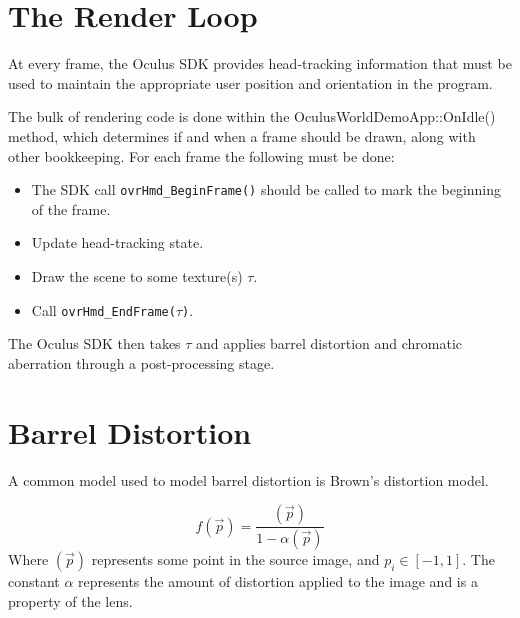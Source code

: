 \documentclass[12pt,a4paper,twoside,openright]{report}
\begin{document}
\section{The Render Loop}
At every frame, the Oculus SDK provides head-tracking information that must be used to maintain the appropriate user position and orientation in the program.

The bulk of rendering code is done within the OculusWorldDemoApp::OnIdle() method, which determines if and when a frame should be drawn, along with other bookkeeping.
For each frame the following must be done:

\begin{itemize}
  \item The SDK call \texttt{ovrHmd\_BeginFrame()} should be called to mark the beginning of the frame.
  \item Update head-tracking state.
  \item Draw the scene to some texture(s) $\tau$.
  \item Call \texttt{ovrHmd\_EndFrame($\tau$)}.
\end{itemize}

The Oculus SDK then takes $\tau$ and applies barrel distortion and chromatic aberration through a post-processing stage. 

\section{Barrel Distortion}\label{barSection}

A common model used to model barrel distortion is Brown's distortion model. 

\[
f(\vec p) = \frac{(\vec p)}{1-\alpha(\vec p)}
\]
Where $(\vec p)$ represents some point in the source image, and $p_i\in[-1,1]$. The constant $\alpha$ represents the amount of distortion applied to the image and is a property of the lens.
\end{document}
